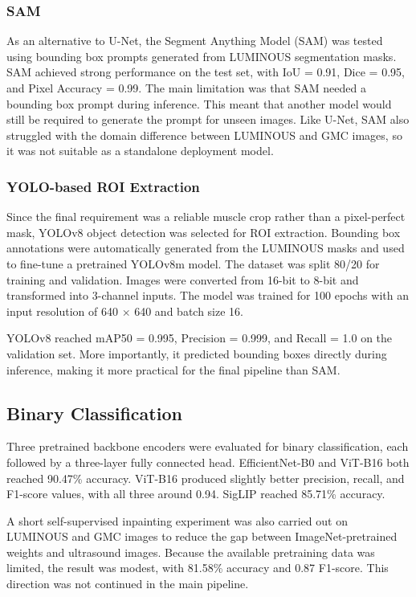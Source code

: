 \subsubsection{SAM}
As an alternative to U-Net, the Segment Anything Model (SAM) was tested using bounding box prompts generated from LUMINOUS segmentation masks. SAM achieved strong performance on the test set, with IoU = 0.91, Dice = 0.95, and Pixel Accuracy = 0.99. The main limitation was that SAM needed a bounding box prompt during inference. This meant that another model would still be required to generate the prompt for unseen images. Like U-Net, SAM also struggled with the domain difference between LUMINOUS and GMC images, so it was not suitable as a standalone deployment model.

\subsubsection{YOLO-based ROI Extraction}
Since the final requirement was a reliable muscle crop rather than a pixel-perfect mask, YOLOv8 object detection was selected for ROI extraction. Bounding box annotations were automatically generated from the LUMINOUS masks and used to fine-tune a pretrained YOLOv8m model. The dataset was split 80/20 for training and validation. Images were converted from 16-bit to 8-bit and transformed into 3-channel inputs. The model was trained for 100 epochs with an input resolution of 640 $\times$ 640 and batch size 16.

YOLOv8 reached mAP50 = 0.995, Precision = 0.999, and Recall = 1.0 on the validation set. More importantly, it predicted bounding boxes directly during inference, making it more practical for the final pipeline than SAM.

\subsection{Binary Classification}
Three pretrained backbone encoders were evaluated for binary classification, each followed by a three-layer fully connected head. EfficientNet-B0 and ViT-B16 both reached 90.47\% accuracy. ViT-B16 produced slightly better precision, recall, and F1-score values, with all three around 0.94. SigLIP reached 85.71\% accuracy.

A short self-supervised inpainting experiment was also carried out on LUMINOUS and GMC images to reduce the gap between ImageNet-pretrained weights and ultrasound images. Because the available pretraining data was limited, the result was modest, with 81.58\% accuracy and 0.87 F1-score. This direction was not continued in the main pipeline.

